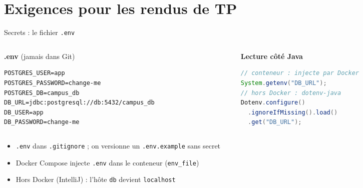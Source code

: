 \documentclass[aspectratio=169,10pt]{beamer}
\begin{document}
\section{Exigences pour les rendus de TP}

\begin{frame}[fragile]{Secrets : le fichier \texttt{.env}}
  \begin{columns}[T]
    \begin{column}{0.48\textwidth}
      \textbf{.env} (\alert{jamais dans Git})
\begin{lstlisting}[language={},basicstyle=\lstcode\scriptsize]
POSTGRES_USER=app
POSTGRES_PASSWORD=change-me
POSTGRES_DB=campus_db
DB_URL=jdbc:postgresql://db:5432/campus_db
DB_USER=app
DB_PASSWORD=change-me
\end{lstlisting}
    \end{column}
    \begin{column}{0.48\textwidth}
      \textbf{Lecture c\^ot\'e Java}
\begin{lstlisting}[language=Java,basicstyle=\lstcode\scriptsize]
// conteneur : injecte par Docker
System.getenv("DB_URL");
// hors Docker : dotenv-java
Dotenv.configure()
  .ignoreIfMissing().load()
  .get("DB_URL");
\end{lstlisting}
    \end{column}
  \end{columns}
  \vspace{2mm}
  \begin{itemize}
    \item \texttt{.env} dans \texttt{.gitignore} ; on versionne un \texttt{.env.example} sans secret
    \item Docker Compose injecte \texttt{.env} dans le conteneur (\texttt{env\_file})
    \item Hors Docker (IntelliJ) : l'h\^ote \texttt{db} devient \texttt{localhost}
  \end{itemize}
\end{frame}
\end{document}
